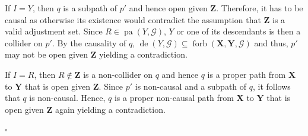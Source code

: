 \documentclass[11pt,a4paper]{article}
\theoremstyle{definition}
\theoremstyle{remark}
\newenvironment{proofof}[1][]{\begin{trivlist}
\item[\hskip \labelsep {\textit{Proof of #1.}}]}{\hfill{}$\square$\end{trivlist}}
\DeclareMathOperator{\Forbb}{forb}
\DeclareMathOperator{\pa}{pa}
\DeclareMathOperator{\de}{de}
\newcommand{\mpdag}{maximal PDAG}
\newcommand{\g}[1][G]{\mathcal{#1}}
\newcommand{\fb}[2][X,Y]{\Forbb(\mathbf{#1},#2)}
\begin{document}
\begin{proofof}[Corollary \ref{cor:goodparents}]
	If $I=Y$, then $q$ is a subpath of $p'$ and hence open given $\mathbf{Z}$. Therefore, it has to be causal as otherwise its existence would contradict the assumption that $\mathbf{Z}$ is a valid adjustment set. Since $R \in \pa(Y,\g)$, $Y$ or one of its descendants is then a collider on $p'$. By the causality of $q$, $\de(Y,\g) \subseteq \fb{\g}$ and thus, $p' $ may not be open given $\mathbf{Z}$ yielding a contradiction.
	
	If $I=R$, then $R \notin \mathbf{Z}$ is a non-collider on $q$ and hence $q$ is a proper path from $\mathbf{X}$ to $\mathbf{Y}$ that is open given $\mathbf{Z}$. Since $p'$ is non-causal and a subpath of $q$, it follows that $q$ is non-causal. Hence, $q$ is a proper non-causal path from $\mathbf{X}$ to $\mathbf{Y}$ that is open given $\mathbf{Z}$ again yielding a contradiction.
	
	

%
%

\end{proofof}
\end{document}
